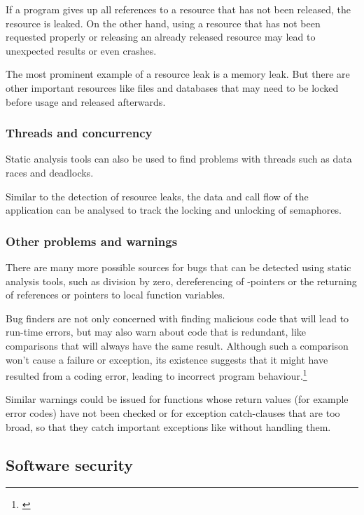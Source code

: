 If a program gives up all references to a resource that has not been released, the resource is leaked. On the other hand, using a resource that has not been requested properly or releasing an already released resource may lead to unexpected results or even crashes.

The most prominent example of a resource leak is a memory leak. But there are other important resources like files and databases that may need to be locked before usage and released afterwards.

\subsubsection{Threads and concurrency}

Static analysis tools can also be used to find problems with threads such as data races and deadlocks.

Similar to the detection of resource leaks, the data and call flow of the application can be analysed to track the locking and unlocking of semaphores.

\subsubsection{Other problems and warnings}

There are many more possible sources for bugs that can be detected using static analysis tools, such as division by zero, dereferencing of -pointers or the returning of references or pointers to local function variables.

Bug finders are not only concerned with finding malicious code that will lead to run-time errors, but may also warn about code that is redundant, like comparisons that will always have the same result. Although such a comparison won't cause a failure or exception, its existence suggests that it might have resulted from a coding error, leading to incorrect program behaviour.\footnote{\citep[1]{UsingSAToFindBugs}}

Similar warnings could be issued for functions whose return values (for example error codes) have not been checked or for exception catch-clauses that are too broad, so that they catch important exceptions like  without handling them.

\subsection{Software security}

